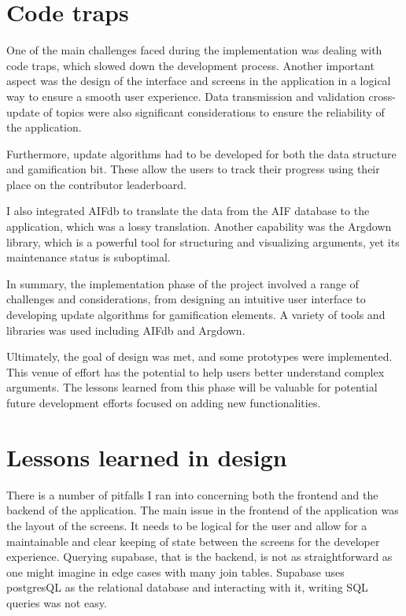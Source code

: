 \documentclass{report}
\begin{document}
\section{Code traps}
One of the main challenges faced during the implementation was dealing with code traps, which slowed down the development process. Another important aspect was the design of the interface and screens in the application in a logical way to ensure a smooth user experience. Data transmission and validation cross-update of topics were also significant considerations to ensure the reliability of the application.

Furthermore, update algorithms had to be developed for both the data structure and gamification bit. These allow the users to track their progress using their place on the contributor leaderboard. 

I also integrated AIFdb to translate the data from the AIF database to the application, which was a lossy translation.
Another capability was the Argdown library, which is a powerful tool for structuring and visualizing arguments, yet its maintenance status is suboptimal.

In summary, the implementation phase of the project involved a range of challenges and considerations, from designing an intuitive user interface to developing update algorithms for gamification elements. A variety of tools and libraries was used including AIFdb and Argdown. 

Ultimately, the goal of design was met, and some prototypes were implemented. This venue of effort has the potential to help users better understand complex arguments. The lessons learned from this phase will be valuable for potential future development efforts focused on adding new functionalities.

\section{Lessons learned in design}
There is a number of pitfalls I ran into concerning both the frontend and the backend of the application. The main issue in the frontend of the application was the layout of the screens. It needs to be logical for the user and allow for a maintainable and clear keeping of state between the screens for the developer experience. Querying supabase, that is the backend, is not as straightforward as one might imagine in edge cases with many join tables. Supabase uses postgresQL as the relational database and interacting with it, writing SQL queries was not easy. 
\end{document}
